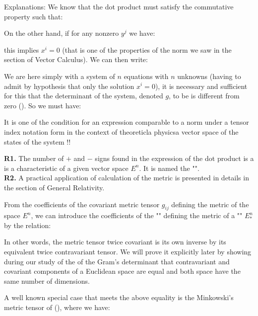 	Explanations: We know that the dot product must satisfy the commutative property such that:
	
	On the other hand, if for any nonzero $y^j$ we have:
	
	this implies $x^i=0$ (that is one of the properties of the norm we saw in the section of Vector Calculus). We can then write:
	
	We are here simply with a system of $n$ equations with $n$ unknowns (having to admit by hypothesis that only the solution $x^i=0$), it is necessary and sufficient for this that the determinant of the system, denoted $g$, to be is different from zero (). So we must have:
	
	It is one of the condition for an expression comparable to a norm under a tensor index notation form in the context of theoreticla physicsa vector space of the states of the system !!
	
	\begin{tcolorbox}[title=Remarks,colframe=black,arc=10pt]
	\textbf{R1.} The number of $+$ and $-$ signs found in the expression of the dot product is a is a characteristic of a given vector space $E^n$. It is named the "".\\
	
	\textbf{R2.} A practical application of calculation of the metric is presented in details in the section of General Relativity.\\
	\end{tcolorbox}
	From the coefficients of the covariant metric tensor $g_{ij}$ defining the metric of the space $E^n$, we can introduce the coefficients of the "" defining the metric of a "" $E_{*}^n$ by the relation:
	
	In other words, the metric tensor twice covariant is its own inverse by its equivalent twice contravariant tensor. We will prove it explicitly later by showing during our study of the of the Gram's determinant that contravariant and covariant components of a Euclidean space are equal and both space have the same number of dimensions.

	A well known special case that meets the above equality is the Minkowski's metric tensor of (), where we have:
	 
